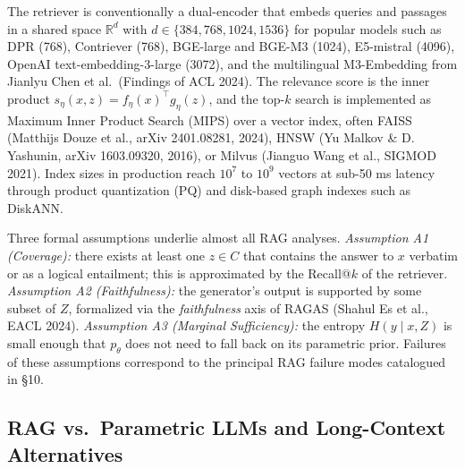 The retriever is conventionally a dual-encoder that embeds queries and passages in a shared space \(\mathbb{R}^d\) with \(d \in \{384, 768, 1024, 1536\}\) for popular models such as DPR (768), Contriever (768), BGE-large and BGE-M3 (1024), E5-mistral (4096), OpenAI text-embedding-3-large (3072), and the multilingual M3-Embedding from Jianlyu Chen et al.~(Findings of ACL 2024). The relevance score is the inner product \(s_\eta(x, z) = f_\eta(x)^\top g_\eta(z)\), and the top-\(k\) search is implemented as Maximum Inner Product Search (MIPS) over a vector index, often FAISS (Matthijs Douze et al., arXiv 2401.08281, 2024), HNSW (Yu Malkov \& D. Yashunin, arXiv 1603.09320, 2016), or Milvus (Jianguo Wang et al., SIGMOD 2021). Index sizes in production reach \(10^7\) to \(10^9\) vectors at sub-50 ms latency through product quantization (PQ) and disk-based graph indexes such as DiskANN.

Three formal assumptions underlie almost all RAG analyses. \emph{Assumption A1 (Coverage):} there exists at least one \(z \in C\) that contains the answer to \(x\) verbatim or as a logical entailment; this is approximated by the Recall@\(k\) of the retriever. \emph{Assumption A2 (Faithfulness):} the generator's output is supported by some subset of \(Z\), formalized via the \emph{faithfulness} axis of RAGAS (Shahul Es et al., EACL 2024). \emph{Assumption A3 (Marginal Sufficiency):} the entropy \(H(y \mid x, Z)\) is small enough that \(p_\theta\) does not need to fall back on its parametric prior. Failures of these assumptions correspond to the principal RAG failure modes catalogued in §10.

\subsection{RAG vs.~Parametric LLMs and Long-Context Alternatives}\label{rag-vs.-parametric-llms-and-long-context-alternatives}


